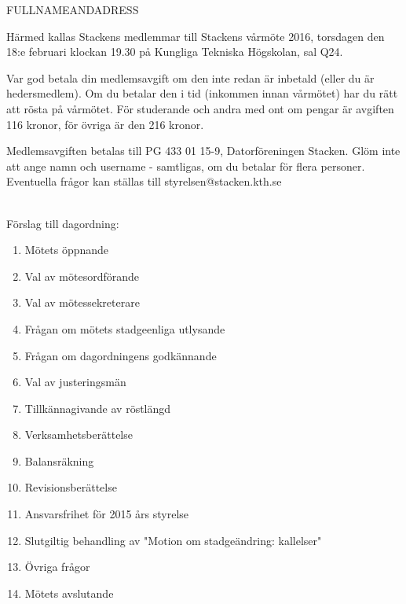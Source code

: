 \documentclass[fontsize=11pt,enlargefirstpage,firstfoot=false,a4paper,pagenumber=no]{scrlttr2}
\begin{document}
 
\begin{letter}{FULLNAMEANDADRESS}

\opening{Härmed kallas Stackens medlemmar till Stackens vårmöte 2016, torsdagen den 18:e februari klockan 19.30 på Kungliga Tekniska Högskolan, sal Q24.}

Var god betala din medlemsavgift om den inte redan är inbetald (eller du är hedersmedlem). Om du betalar den i tid (inkommen innan vårmötet) har du rätt att rösta på vårmötet. För studerande och andra med ont om pengar är avgiften 116 kronor, för övriga är den 216 kronor.

Medlemsavgiften betalas till PG 433 01 15-9, Datorföreningen Stacken. Glöm inte att ange namn och username - samtligas, om du betalar för flera personer. Eventuella frågor kan ställas till styrelsen@stacken.kth.se

~\\
Förslag till dagordning:

\begin{multicols}{2}
\begin{enumerate}
	\itemsep0em
	\item  Mötets öppnande
	\item  Val av mötesordförande
	\item  Val av mötessekreterare
	\item  Frågan om mötets stadgeenliga utlysande
	\item  Frågan om dagordningens godkännande
	\item  Val av justeringsmän
	\item  Tillkännagivande av röstlängd
	\item  Verksamhetsberättelse
	\item  Balansräkning
	\item  Revisionsberättelse
	\item  Ansvarsfrihet för 2015 års styrelse
	\item  Slutgiltig behandling av "Motion om stadgeändring: kallelser"
	\item  Övriga frågor
	\item  Mötets avslutande
\end{enumerate}
\end{multicols}

\closing{}
\enlargethispage{3\baselineskip}

\end{letter}
\end{document}
